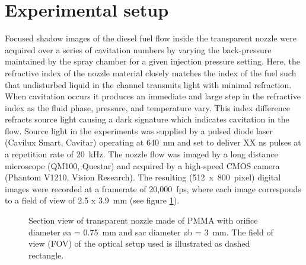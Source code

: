 \documentclass[letterpaper,twocolumn,10pt]{ilass}
\begin{document}
\section*{Experimental setup}
Focused shadow images of the diesel fuel flow inside the transparent nozzle
were acquired over a series of cavitation numbers by varying
the back-pressure maintained by the spray chamber for a given injection pressure
setting.
%
Here, the refractive index of the nozzle material closely matches the index of the fuel such that undisturbed liquid in the channel transmits light with minimal refraction.
When cavitation occurs it produces an immediate and large step in the refractive index
as the fluid phase, pressure, and temperature vary. This index difference refracts source
light causing a dark signature which indicates cavitation in the flow.  
%
Source light in the experiments was supplied by a pulsed diode laser (Cavilux Smart, Cavitar)
operating at 640~nm and set to deliver XX ns pulses at a repetition rate of 20~kHz.
%
The nozzle flow was imaged by a long distance microscope (QM100, Questar)
and acquired by a high-speed CMOS camera (Phantom V1210, Vision Research).
%
The resulting (512~x~800~pixel) digital images were recorded at a framerate of 20,000~fps,
where each image corresponds to a field of view of 2.5 x 3.9~mm (see figure \ref{fig3}). 
%

\begin{figure}[h]
\begin{center}
\end{center}
\vspace*{-10mm}
\caption{Section view of transparent nozzle made of PMMA with orifice diameter
         \o a = 0.75~mm and sac diameter \o b = 3~mm. The field of view (FOV)
				 of the optical setup used is illustrated as dashed rectangle.}
\label{fig3} 
\end{figure}
\end{document}
